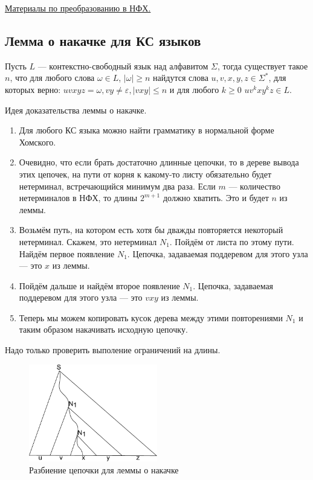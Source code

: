 \href{https://neerc.ifmo.ru/wiki/index.php?title=%D0%9D%D0%BE%D1%80%D0%BC%D0%B0%D0%BB%D1%8C%D0%BD%D0%B0%D1%8F_%D1%84%D0%BE%D1%80%D0%BC%D0%B0_%D0%A5%D0%BE%D0%BC%D1%81%D0%BA%D0%BE%D0%B3%D0%BE}{Материалы по преобразованию в НФХ.}


\subsection{Лемма о накачке для КС языков}

\begin{theorem}
Пусть $L$ --- контекстно-свободный язык над алфавитом $\Sigma$, тогда существует такое $n$, что для любого слова $\omega \in L$, $|\omega| \geq n$ найдутся слова $u,v,x,y,z\in \Sigma^*$, для которых верно: $uvxyz = \omega, vy\neq \varepsilon,|vxy|\leq n$ и для любого $k \geq 0$  $uv^kxy^kz \in L$.
\end{theorem}

Идея доказательства леммы о накачке.

\begin{enumerate}
    \item Для любого КС языка можно найти грамматику в нормальной форме Хомского.
    \item Очевидно, что если брать достаточно длинные цепочки, то в дереве вывода этих цепочек, на пути от корня к какому-то листу обязательно будет нетерминал, встречающийся минимум два раза. Если $m$ --- количество нетерминалов в НФХ, то длины $2^{m+1}$ должно хватить. Это и будет $n$ из леммы.
    \item Возьмём путь, на котором есть хотя бы дважды повторяется некоторый нетерминал. Скажем, это нетерминал  $N_1$. Пойдём от листа по этому пути. Найдём первое появление $N_1$. Цепочка, задаваемая поддеревом для этого узла --- это $x$ из леммы.
    \item Пойдём дальше и найдём второе появление $N_1$. Цепочка, задаваемая поддеревом для этого узла --- это $vxy$ из леммы.
    \item Теперь мы можем копировать кусок дерева между этими повторениями $N_1$ и таким образом накачивать исходную цепочку.
\end{enumerate}

Надо только проверить выполение ограничений на длины.

\begin{figure}
\centering
\includegraphics[width=0.5\textwidth]{figures/pumping_tree_1.pdf}
\caption{Разбиение цепочки для леммы о накачке}
\label{fig:pumping1}
\end{figure}

